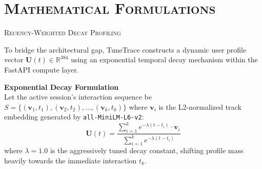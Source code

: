 \documentclass[xcolor=dvipsnames, aspectratio=1610]{beamer}
\begin{document}
\section{\textsc{Mathematical Formulations}}
\begin{frame}{\textsc{Recency-Weighted Decay Profiling}}

  To bridge the architectural gap, TuneTrace constructs a dynamic user profile vector $\mathbf{U}(t) \in \mathbb{R}^{384}$ using an exponential temporal decay mechanism within the FastAPI compute layer.
  
  \vspace{5mm}
  \begin{ExampleBox}
    \textbf{Exponential Decay Formulation} \\
    Let the active session's interaction sequence be $S = \{(\mathbf{v}_1, t_1), (\mathbf{v}_2, t_2), \dots, (\mathbf{v}_k, t_k)\}$ where $\mathbf{v}_i$ is the L2-normalized track embedding generated by \texttt{all-MiniLM-L6-v2}:
    \begin{equation}
        \mathbf{U}(t) = \frac{\sum_{i=1}^k e^{-\lambda(t - t_i)} \cdot \mathbf{v}_i}{\sum_{i=1}^k e^{-\lambda(t - t_i)}}
    \end{equation}
    where $\lambda = 1.0$ is the aggressively tuned decay constant, shifting profile mass heavily towards the immediate interaction $t_k$.
  \end{ExampleBox}

\end{frame}
\end{document}
